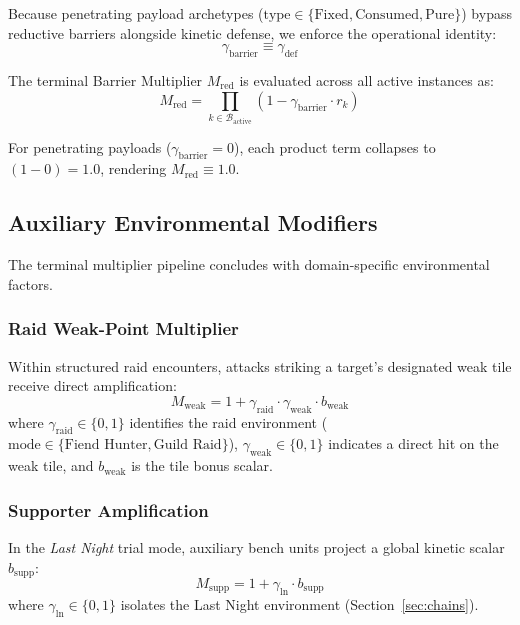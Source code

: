 \documentclass[twocolumn,10pt]{article}
\begin{document}
Because penetrating payload archetypes ($\text{type} \in \{\text{Fixed}, \text{Consumed}, \text{Pure}\}$) bypass reductive barriers alongside kinetic defense, we enforce the operational identity:
\begin{equation}
\label{eq:gamma_barrier_identity}
\gamma_{\text{barrier}} \equiv \gamma_{\text{def}}
\end{equation}

The terminal Barrier Multiplier $M_{\text{red}}$ is evaluated across all active instances as:
\begin{equation}
\label{eq:barrier_multiplier}
M_{\text{red}} = \prod_{k \in \mathcal{B}_{\text{active}}} \left( 1 - \gamma_{\text{barrier}} \cdot r_k \right)
\end{equation}

For penetrating payloads ($\gamma_{\text{barrier}} = 0$), each product term collapses to $(1 - 0) = 1.0$, rendering $M_{\text{red}} \equiv 1.0$.
\subsection{Auxiliary Environmental Modifiers}

The terminal multiplier pipeline concludes with domain-specific environmental factors.

  \subsubsection{Raid Weak-Point Multiplier}
  Within structured raid encounters, attacks striking a target's designated weak tile receive direct amplification:
    \begin{equation}
    \label{eq:weak_multiplier}
      M_{\text{weak}} = 1 + \gamma_{\text{raid}} \cdot \gamma_{\text{weak}} \cdot b_{\text{weak}}
    \end{equation}
    where $\gamma_{\text{raid}} \in \{0, 1\}$ identifies the raid environment ($\text{mode} \in \{\text{Fiend Hunter}, \text{Guild Raid}\}$), $\gamma_{\text{weak}} \in \{0, 1\}$ indicates a direct hit on the weak tile, and $b_{\text{weak}}$ is the tile bonus scalar.

    \subsubsection{Supporter Amplification}
    In the \textit{Last Night} trial mode, auxiliary bench units project a global kinetic scalar $b_{\text{supp}}$:
    \begin{equation}
    \label{eq:supp_multiplier}
      M_{\text{supp}} = 1 + \gamma_{\text{ln}} \cdot b_{\text{supp}}
    \end{equation}
    where $\gamma_{\text{ln}} \in \{0, 1\}$ isolates the Last Night environment (Section~\ref{sec:chains}).
\end{document}

